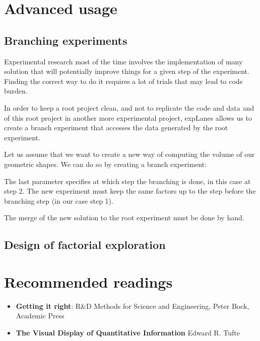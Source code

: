 \documentclass[a4paper,fleqn]{tufte-handout}
\newcommand{\explanes}{\textsf{expLanes} }
\begin{document}
\section{Advanced usage}

\subsection{Branching experiments}

Experimental research most of the time involves the implementation of many solution that will potentially improve things for a given step of the experiment. Finding the correct way to do it requires a lot of trials that may lead to code burden.

In order to keep a root project clean, and not to replicate the code and data and of this root project in another more experimental project, \explanes allows us to create a branch experiment that accesses the data generated by the root experiment.

Let us assume that we want to create a new way of computing the volume of our geometric shapes. We can do so by creating a branch experiment:


The last parameter specifies at which step the branching is done, in this case at step 2.
The new experiment must keep the same factors up to the step before the branching step (in our case step 1).

The merge of the new solution to the root experiment must be done by hand.

\subsection{Design of factorial exploration}



%
%
%
%
%
%
%
%
%
%
%
%
%

\section{Recommended readings}

\begin{itemize}

\item \textbf{Getting it right}: R\&D Methods for Science and Engineering, Peter Bock, Academic Press

\item \textbf{The Visual Display of Quantitative Information} Edward R. Tufte

\end{itemize}











\end{document}
